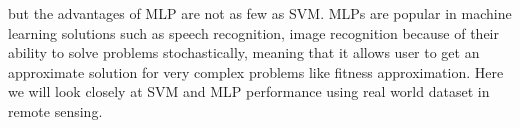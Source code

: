 but the advantages of MLP are not as few as SVM. 
MLPs are popular in machine learning solutions such as speech recognition, image recognition because of their ability to solve problems stochastically, meaning that it allows user to get an approximate solution for very complex problems like fitness approximation\cite{jin2005neural}. 
Here we will look closely at SVM and MLP performance using real world dataset in remote sensing.\\

